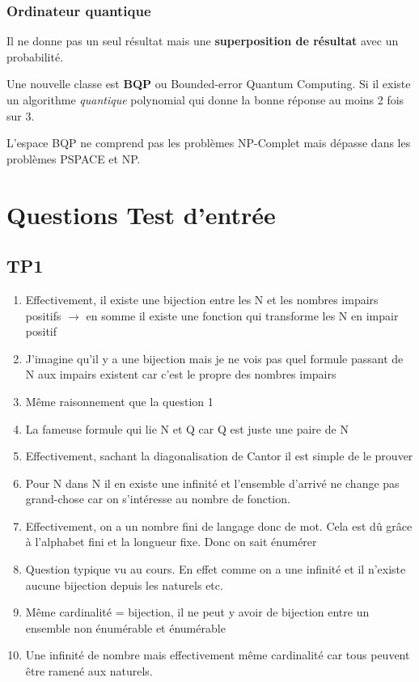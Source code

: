 \documentclass{report}
\begin{document}
\subsection{Ordinateur quantique}

Il ne donne pas un seul résultat mais une \textbf{superposition de résultat} avec un probabilité.\par 
Une nouvelle classe est \textbf{BQP} ou Bounded-error Quantum Computing. Si il existe un algorithme \textit{quantique} polynomial qui donne la bonne réponse au moins 2 fois sur 3.\par 
L'espace BQP ne comprend pas les problèmes NP-Complet mais dépasse dans les problèmes PSPACE et NP.



\chapter{Questions Test d'entrée}

\section{TP1}
\begin{enumerate}
\item Effectivement, il existe une bijection entre les N et les nombres impairs positifs $\rightarrow$ en somme il existe une fonction qui transforme les N en impair positif
\item J'imagine qu'il y a une bijection mais je ne vois pas quel formule passant de N aux impairs existent car c'est le propre des nombres impairs 
\item Même raisonnement que la question 1
\item La fameuse formule qui lie N et Q car Q est juste une paire de N
\item Effectivement, sachant la diagonalisation de Cantor il est simple de le prouver
\item Pour N dans N il en existe une infinité et l'ensemble d'arrivé ne change pas grand-chose car on s'intéresse au nombre de fonction.
\item Effectivement, on a un nombre fini de langage donc de mot. Cela est dû grâce à l'alphabet fini et la longueur fixe. Donc on sait énumérer
\item Question typique vu au cours. En effet comme on a une infinité et il n'existe aucune bijection depuis les naturels etc.
\item Même cardinalité = bijection, il ne peut y avoir de bijection entre un ensemble non énumérable et énumérable
\item Une infinité de nombre mais effectivement même cardinalité car tous peuvent être ramené aux naturels.


\end{enumerate}
\end{document}
